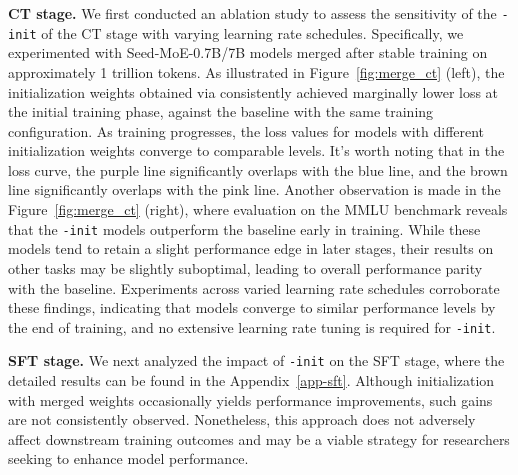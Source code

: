 \textbf{CT stage.}
We first conducted an ablation study to assess the sensitivity of the \texttt{\OURS{}-init} of the CT stage with varying learning rate schedules.
Specifically, we experimented with Seed-MoE-0.7B/7B models merged after stable training on approximately 1 trillion tokens. 
As illustrated in Figure~\ref{fig:merge_ct} (left), the initialization weights obtained via \OURS{} consistently achieved marginally lower loss at the initial training phase, against the baseline with the same training configuration. 
As training progresses, the loss values for models with different initialization weights converge to comparable levels. 
It's worth noting that in the loss curve, the purple line significantly overlaps with the blue line, and the brown line significantly overlaps with the pink line.
Another observation is made in the Figure~\ref{fig:merge_ct} (right), where evaluation on the MMLU benchmark reveals that the \texttt{\OURS{}-init} models outperform the baseline early in training. While these models tend to retain a slight performance edge in later stages, their results on other tasks may be slightly suboptimal, leading to overall performance parity with the baseline. Experiments across varied learning rate schedules corroborate these findings, indicating that models converge to similar performance levels by the end of training, and no extensive learning rate tuning is required for \texttt{\OURS{}-init}. 

\textbf{SFT stage.}
We next analyzed the impact of \texttt{\OURS{}-init} on the SFT stage, where the detailed results can be found in the Appendix~\ref{app-sft}. 
Although initialization with merged weights occasionally yields performance improvements, such gains are not consistently observed. 
Nonetheless, this approach does not adversely affect downstream training outcomes and may be a viable strategy for researchers seeking to enhance model performance.


